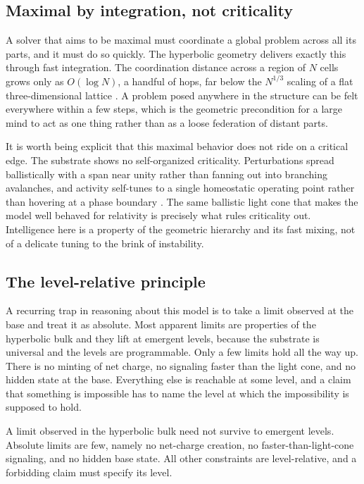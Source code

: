 \subsection{Maximal by integration, not criticality}

A solver that aims to be maximal must coordinate a global problem across all its parts, and it must do so quickly.
The hyperbolic geometry delivers exactly this through fast integration. The coordination distance across a region
of $N$ cells grows only as $O(\log N)$, a handful of hops, far below the $N^{1/3}$ scaling of a flat
three-dimensional lattice \cite{pollard2026vibetest}. A problem posed anywhere in the structure can be felt
everywhere within a few steps, which is the geometric precondition for a large mind to act as one thing rather
than as a loose federation of distant parts.

It is worth being explicit that this maximal behavior does not ride on a critical edge. The substrate shows no
self-organized criticality. Perturbations spread ballistically with a span near unity rather than fanning out into
branching avalanches, and activity self-tunes to a single homeostatic operating point rather than hovering at a
phase boundary \cite{pollard2026vibetest}. The same ballistic light cone that makes the model well behaved for
relativity is precisely what rules criticality out. Intelligence here is a property of the geometric hierarchy and
its fast mixing, not of a delicate tuning to the brink of instability.

\subsection{The level-relative principle}

A recurring trap in reasoning about this model is to take a limit observed at the base and treat it as absolute.
Most apparent limits are properties of the hyperbolic bulk and they lift at emergent levels, because the substrate
is universal and the levels are programmable. Only a few limits hold all the way up. There is no minting of net
charge, no signaling faster than the light cone, and no hidden state at the base. Everything else is reachable at
some level, and a claim that something is impossible has to name the level at which the impossibility is supposed
to hold.

\begin{principle}
A limit observed in the hyperbolic bulk need not survive to emergent levels. Absolute limits are few, namely no
net-charge creation, no faster-than-light-cone signaling, and no hidden base state. All other constraints are
level-relative, and a forbidding claim must specify its level.
\end{principle}

